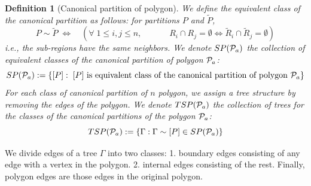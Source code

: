 \documentclass[10pt,reqno]{article}
\theoremstyle{plain} %
\newtheorem{definition}[theorem]{Definition}
\theoremstyle{remark}
\numberwithin{equation}{section}
\begin{document}
\begin{definition}[Canonical partition of polygon]
 We define the equivalent class of the canonical  partition as follows: for partitions $P$ and $\widetilde{P}$, 
 $$P\sim \widetilde{P}\;\iff
\quad \left(\forall\; 1\le  i,j\le n, \quad \quad \quad \; R_{i}\cap R_j=\emptyset \iff
  \widetilde{R}_{i}\cap \widetilde{R}_j=\emptyset \right)$$
i.e., the sub-regions have the same neighbors. 
We denote $SP({\cal P}_{\textbf{a}})$ the collection of equivalent classes of the canonical partition of polygon ${\cal P}_{\textbf{a}}$: 
$$
SP({\cal P}_{\textbf{a}}):= \{[P]: \; \hbox{$[P]$ is equivalent class  of the canonical partition of polygon ${\cal P}_{\textbf{a}}$}\}$$
For each class of canonical partition of $n$ polygon, we assign {a tree structure by removing the edges of the  polygon. }  We denote $TSP({\cal P}_{\textbf{a}})$  the collection of  trees for the classes of the canonical partitions of the polygon ${\cal P}_{\textbf{a}}$:  
$$
TSP({\cal P}_{\textbf{a}}):=\left\{\Gamma: \Gamma\sim [P]\in SP({\cal P}_{\textbf{a}})\right\}$$



\end{definition}

{We divide edges of a tree $\Gamma$ into two classes: 1. boundary edges consisting of any edge with a vertex in the polygon. 2. internal edges consisting of the rest.  Finally, polygon edges are those edges in the original polygon. }
 
\end{document}
